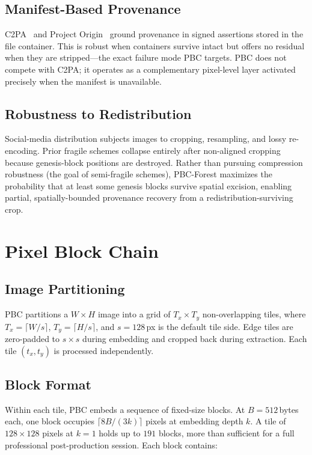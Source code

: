 \documentclass[conference]{IEEEtran}
\begin{document}
\subsection{Manifest-Based Provenance}

C2PA~\cite{c2pa_spec} and Project Origin~\cite{aythora2020origin} ground
provenance in signed assertions stored in the file container. This is
robust when containers survive intact but offers no residual when they
are stripped---the exact failure mode PBC targets. PBC does not compete
with C2PA; it operates as a complementary pixel-level layer activated
precisely when the manifest is unavailable.

\subsection{Robustness to Redistribution}

Social-media distribution subjects images to cropping, resampling, and
lossy re-encoding. Prior fragile schemes collapse entirely after
non-aligned cropping because genesis-block positions are destroyed.
Rather than pursuing compression robustness (the goal of semi-fragile
schemes), PBC-Forest maximizes the probability that at least some genesis
blocks survive spatial excision, enabling partial, spatially-bounded
provenance recovery from a redistribution-surviving crop.

\section{Pixel Block Chain}
\label{sec:method}

\subsection{Image Partitioning}

PBC partitions a $W \times H$ image into a grid of
$T_x \times T_y$ non-overlapping tiles, where
$T_x = \lceil W / s \rceil$, $T_y = \lceil H / s \rceil$,
and $s = 128$\,px is the default tile side. Edge tiles are zero-padded
to $s \times s$ during embedding and cropped back during extraction.
Each tile $(t_x, t_y)$ is processed independently.

\subsection{Block Format}

Within each tile, PBC embeds a sequence of fixed-size blocks.
At $B = 512$\,bytes each, one block occupies
$\lceil 8B / (3k) \rceil$ pixels at embedding depth $k$.
A tile of $128 \times 128$ pixels at $k{=}1$ holds up to $191$ blocks,
more than sufficient for a full professional post-production session.
Each block contains:
\end{document}
